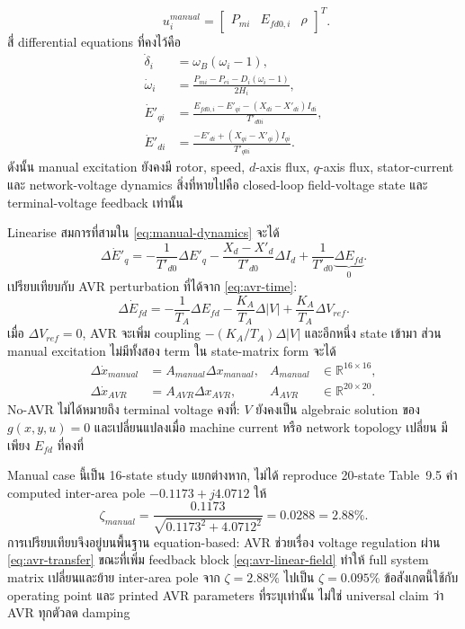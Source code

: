 \documentclass[12pt,a4paper]{article}
\begin{document}
\begin{itemize}
\begin{equation}
  \qquad
  u_i^{manual}=
  \begin{bmatrix}P_{mi}&E_{fd0,i}&\rho\end{bmatrix}^{T}.
  \label{eq:manual-state-input}
  \end{equation}
  สี่ differential equations ที่คงไว้คือ
  \begin{align}
  \dot\delta_i&=\omega_B(\omega_i-1),\\
  \dot\omega_i&=
  \frac{P_{mi}-P_{ei}-D_i(\omega_i-1)}{2H_i},\\
  \dot E'_{qi}&=
  \frac{E_{fd0,i}-E'_{qi}-(X_{di}-X'_{di})I_{di}}{T'_{d0i}},\\
  \dot E'_{di}&=
  \frac{-E'_{di}+(X_{qi}-X'_{qi})I_{qi}}{T'_{q0i}}.
  \label{eq:manual-dynamics}
  \end{align}
  ดังนั้น manual excitation ยังคงมี rotor, speed, $d$-axis flux, $q$-axis flux, stator-current และ network-voltage dynamics สิ่งที่หายไปคือ closed-loop field-voltage state และ terminal-voltage feedback เท่านั้น

  Linearise สมการที่สามใน \eqref{eq:manual-dynamics} จะได้
  \begin{equation}
  \Delta\dot E'_q=
  -\frac{1}{T'_{d0}}\Delta E'_q
  -\frac{X_d-X'_d}{T'_{d0}}\Delta I_d
  +\frac{1}{T'_{d0}}\underbrace{\Delta E_{fd}}_{0}.
  \label{eq:manual-linear-field}
  \end{equation}
  เปรียบเทียบกับ AVR perturbation ที่ได้จาก \eqref{eq:avr-time}:
  \begin{equation}
  \Delta\dot E_{fd}
  =-\frac{1}{T_A}\Delta E_{fd}
   -\frac{K_A}{T_A}\Delta|V|
   +\frac{K_A}{T_A}\Delta V_{ref}.
  \label{eq:avr-linear-field}
  \end{equation}
  เมื่อ $\Delta V_{ref}=0$, AVR จะเพิ่ม coupling $-(K_A/T_A)\Delta|V|$ และอีกหนึ่ง state เข้ามา ส่วน manual excitation ไม่มีทั้งสอง term ใน state-matrix form จะได้
  \begin{equation}
  \begin{aligned}
  \Delta\dot x_{manual}&=A_{manual}\Delta x_{manual},
  &A_{manual}&\in\mathbb{R}^{16\times16},\\
  \Delta\dot x_{AVR}&=A_{AVR}\Delta x_{AVR},
  &A_{AVR}&\in\mathbb{R}^{20\times20}.
  \end{aligned}
  \end{equation}
  No-AVR ไม่ได้หมายถึง terminal voltage คงที่: $V$ ยังคงเป็น algebraic solution ของ $g(x,y,u)=0$ และเปลี่ยนแปลงเมื่อ machine current หรือ network topology เปลี่ยน มีเพียง $E_{fd}$ ที่คงที่

  Manual case นี้เป็น 16-state study แยกต่างหาก, ไม่ได้ reproduce 20-state Table~9.5 ค่า computed inter-area pole $-0.1173+j4.0712$ ให้
  \begin{equation}
  \zeta_{manual}=\frac{0.1173}{\sqrt{0.1173^2+4.0712^2}}
  =0.0288=2.88\%.
  \end{equation}
  การเปรียบเทียบจึงอยู่บนพื้นฐาน equation-based: AVR ช่วยเรื่อง voltage regulation ผ่าน \eqref{eq:avr-transfer} ขณะที่เพิ่ม feedback block \eqref{eq:avr-linear-field} ทำให้ full system matrix เปลี่ยนและย้าย inter-area pole จาก $\zeta=2.88\%$ ไปเป็น $\zeta=0.095\%$ ข้อสังเกตนี้ใช้กับ operating point และ printed AVR parameters ที่ระบุเท่านั้น ไม่ใช่ universal claim ว่า AVR ทุกตัวลด damping
\end{itemize}
\end{document}
